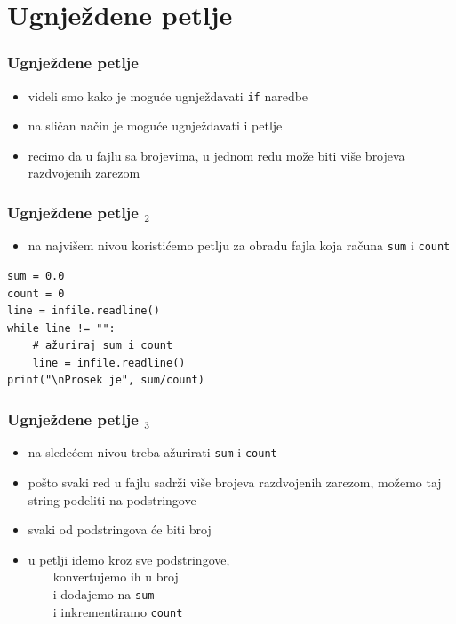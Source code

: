 \documentclass[utf8,compress]{beamer}
\begin{document}
\section[Ugnježdavanje]{Ugnježdene petlje}

\begin{frame}[fragile]
  \frametitle{Ugnježdene petlje}
  \begin{itemize}
    \item videli smo kako je moguće ugnježdavati \texttt{if} naredbe
    \item na sličan način je moguće ugnježdavati i petlje
    \item recimo da u fajlu sa brojevima, u jednom redu može biti više brojeva razdvojenih zarezom
  \end{itemize}
\end{frame}

\begin{frame}[fragile]
  \frametitle{Ugnježdene petlje $_2$}
  \begin{itemize}
    \item na najvišem nivou koristićemo petlju za obradu fajla koja računa \texttt{sum} i \texttt{count}
  \end{itemize}
\begin{verbatim}
sum = 0.0
count = 0
line = infile.readline()
while line != "":
    # ažuriraj sum i count
    line = infile.readline()
print("\nProsek je", sum/count)
\end{verbatim}
\end{frame}

\begin{frame}[fragile]
  \frametitle{Ugnježdene petlje $_3$}
  \begin{itemize}
    \item na sledećem nivou treba ažurirati \texttt{sum} i \texttt{count}
    \item pošto svaki red u fajlu sadrži više brojeva razdvojenih zarezom, možemo taj string podeliti na podstringove
    \item svaki od podstringova će biti broj
    \item u petlji idemo kroz sve podstringove, \\
    \ \ \ \ konvertujemo ih u broj \\
    \ \ \ \ i dodajemo na \texttt{sum} \\
    \ \ \ \ i inkrementiramo \texttt{count}
  \end{itemize}
\end{frame}
\end{document}
